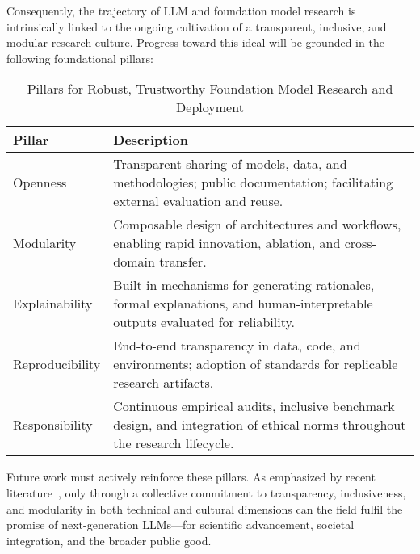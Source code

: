 Consequently, the trajectory of LLM and foundation model research is intrinsically linked to the ongoing cultivation of a transparent, inclusive, and modular research culture. Progress toward this ideal will be grounded in the following foundational pillars:

\begin{table*}[htbp]
\centering
\caption{Pillars for Robust, Trustworthy Foundation Model Research and Deployment}
\label{tab:pillars_future}
\begin{adjustbox}{max width=\textwidth}
\begin{tabular}{ll}
\toprule
\textbf{Pillar} & \textbf{Description} \\
\midrule
Openness        & Transparent sharing of models, data, and methodologies; public documentation; facilitating external evaluation and reuse. \\
Modularity      & Composable design of architectures and workflows, enabling rapid innovation, ablation, and cross-domain transfer. \\
Explainability  & Built-in mechanisms for generating rationales, formal explanations, and human-interpretable outputs evaluated for reliability. \\
Reproducibility & End-to-end transparency in data, code, and environments; adoption of standards for replicable research artifacts. \\
Responsibility  & Continuous empirical audits, inclusive benchmark design, and integration of ethical norms throughout the research lifecycle. \\
\bottomrule
\end{tabular}
\end{adjustbox}
\end{table*}

Future work must actively reinforce these pillars. As emphasized by recent literature~\cite{ref91,ref92,ref93,ref94,ref95,ref96,ref97,ref98,ref99,ref100,ref101,ref102,ref103,ref104,ref105,ref106,ref107,ref108}, only through a collective commitment to transparency, inclusiveness, and modularity in both technical and cultural dimensions can the field fulfil the promise of next-generation LLMs—for scientific advancement, societal integration, and the broader public good.

